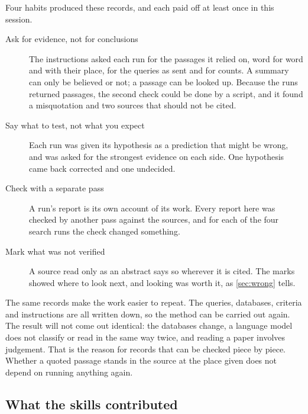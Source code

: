 Four habits produced these records, and each paid off at least once in
this session.
\begin{description}
  \item[Ask for evidence, not for conclusions] The instructions asked
    each run for the passages it relied on, word for word and with
    their place, for the queries as sent and for counts.
    A summary can only be believed or not; a passage can be looked up.
    Because the runs returned passages, the second check could be done
    by a script, and it found a misquotation and two sources that
    should not be cited.
  \item[Say what to test, not what you expect] Each run was given its
    hypothesis as a prediction that might be wrong, and was asked for
    the strongest evidence on each side.
    One hypothesis came back corrected and one undecided.
  \item[Check with a separate pass] A run's report is its own account
    of its work.
    Every report here was checked by another pass against the sources,
    and for each of the four search runs the check changed something.
  \item[Mark what was not verified] A source read only as an abstract
    says so wherever it is cited.
    The marks showed where to look next, and looking was worth it, as
    \cref{sec:wrong} tells.
\end{description}

The same records make the work easier to repeat.
The queries, databases, criteria and instructions are all written down,
so the method can be carried out again.
The result will not come out identical: the databases change, a
language model does not classify or read in the same way twice, and
reading a paper involves judgement.
That is the reason for records that can be checked piece by piece.
Whether a quoted passage stands in the source at the place given does
not depend on running anything again.

\subsection{What the skills contributed}

